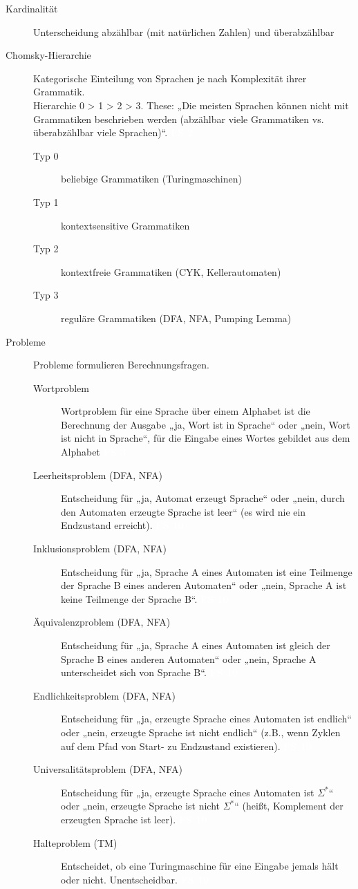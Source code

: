 \documentclass[a4paper,10pt]{article}
\newcommand{\vl}[1]{\colorbox{vl}{\textcolor{white}{\small\textbf{#1}}}}
\begin{document}
\begin{description}
        \item[Kardinalität] Unterscheidung abzählbar (mit natürlichen Zahlen) und überabzählbar

        \item[Chomsky-Hierarchie]
            Kategorische Einteilung von Sprachen je nach Komplexität ihrer Grammatik. \\
            Hierarchie 0 > 1 > 2 > 3.
            These: „Die meisten Sprachen können nicht mit Grammatiken beschrieben
            werden (abzählbar viele Grammatiken vs. überabzählbar viele Sprachen)“. \vl{FS 2}
            \begin{description}
                \item[Typ 0] beliebige Grammatiken (Turingmaschinen)
                \item[Typ 1] kontextsensitive Grammatiken
                \item[Typ 2] kontextfreie Grammatiken (CYK, Kellerautomaten)
                \item[Typ 3] reguläre Grammatiken (DFA, NFA, Pumping Lemma)
            \end{description}

        \item[Probleme] Probleme formulieren Berechnungsfragen.
            \begin{description}
                \item[Wortproblem] Wortproblem für eine Sprache über einem Alphabet ist die Berechnung der Ausgabe „ja, Wort ist in Sprache“ oder „nein, Wort ist nicht in Sprache“, für die Eingabe eines Wortes gebildet aus dem Alphabet \vl{FS 3}
                \item[Leerheitsproblem (DFA, NFA)] Entscheidung für „ja, Automat erzeugt Sprache“ oder „nein, durch den Automaten erzeugte Sprache ist leer“ (es wird nie ein Endzustand erreicht). \vl{FS 10}
                \item[Inklusionsproblem (DFA, NFA)] Entscheidung für „ja, Sprache A eines Automaten ist eine Teilmenge der Sprache B eines anderen Automaten“ oder „nein, Sprache A ist keine Teilmenge der Sprache B“. \vl{FS 10}
                \item[Äquivalenzproblem (DFA, NFA)] Entscheidung für „ja, Sprache A eines Automaten ist gleich der Sprache B eines anderen Automaten“ oder „nein, Sprache A unterscheidet sich von Sprache B“. \vl{FS 10}
                \item[Endlichkeitsproblem (DFA, NFA)] Entscheidung für „ja, erzeugte Sprache eines Automaten ist endlich“ oder „nein, erzeugte Sprache ist nicht endlich“ (z.B., wenn Zyklen auf dem Pfad von Start- zu Endzustand existieren). \vl{FS 10}
                \item[Universalitätsproblem (DFA, NFA)] Entscheidung für „ja, erzeugte Sprache eines Automaten ist $\Sigma^*$“ oder „nein, erzeugte Sprache ist nicht $\Sigma^*$“ (heißt, Komplement der erzeugten Sprache ist leer). \vl{FS 10}
                \item[Halteproblem (TM)] Entscheidet, ob eine Turingmaschine für eine Eingabe jemals hält oder nicht. Unentscheidbar. \vl{FS 19}
            \end{description}


\end{description}
\end{document}
